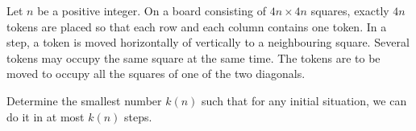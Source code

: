 Let $n$ be a positive integer. On a board consisting of $4n \times 4n$ squares, exactly $4n$ tokens are placed so that each row and each column contains one token. In a step, a token is moved horizontally of vertically to a neighbouring square. Several tokens may occupy the same square at the same time. The tokens are to be moved to occupy all the squares of one of the two diagonals.

Determine the smallest number $k(n)$ such that for any initial situation, we can do it in at most $k(n)$ steps.